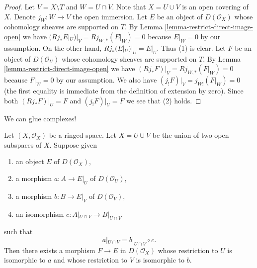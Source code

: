 \begin{proof}
Let $V = X \setminus T$ and $W = U \cap V$. Note that $X = U \cup V$ is an
open covering of $X$. Denote $j_W : W \to V$ the open immersion.
Let $E$ be an object of $D(\mathcal{O}_X)$ whose cohomology sheaves are
supported on $T$. By
Lemma \ref{lemma-restrict-direct-image-open} we have
$(Rj_*E|_U)|_V = Rj_{W, *}(E|_W) = 0$ because $E|_W = 0$ by our assumption.
On the other hand, $Rj_*(E|_U)|_U = E|_U$. Thus (1) is clear.
Let $F$ be an object of $D(\mathcal{O}_U)$ whose cohomology sheaves
are supported on $T$. By
Lemma \ref{lemma-restrict-direct-image-open} we have
$(Rj_*F)|_V = Rj_{W, *}(F|_W) = 0$ because $F|_W = 0$ by our assumption.
We also have $(j_!F)|_V = j_{W!}(F|_W) = 0$ (the first equality is immediate
from the definition of extension by zero). Since both
$(Rj_*F)|_U = F$ and $(j_!F)|_U = F$ we see that (2) holds.
\end{proof}

\noindent
We can glue complexes!

\begin{lemma}
\label{lemma-glue}
Let $(X, \mathcal{O}_X)$ be a ringed space. Let $X = U \cup V$ be
the union of two open subspaces of $X$. Suppose given
\begin{enumerate}
\item an object $E$ of $D(\mathcal{O}_X)$,
\item a morphism $a : A \to E|_U$ of $D(\mathcal{O}_U)$,
\item a morphism $b : B \to E|_V$ of $D(\mathcal{O}_V)$,
\item an isomorphism $c : A|_{U \cap V} \to B|_{U \cap V}$
\end{enumerate}
such that
$$
a|_{U \cap V}  = b|_{U \cap V} \circ c.
$$
Then there exists a morphism $F \to E$ in $D(\mathcal{O}_X)$
whose restriction to $U$ is isomorphic to $a$
and whose restriction to $V$ is isomorphic to $b$.
\end{lemma}

